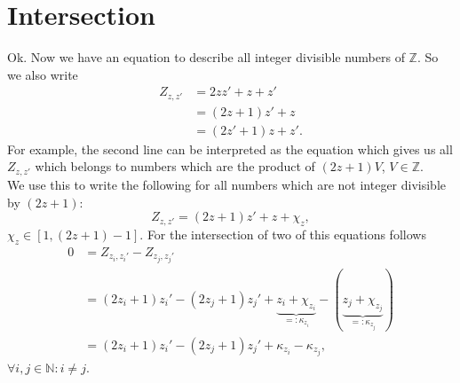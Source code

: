 \section{Intersection}
\label{s:intersection}
Ok. Now we have an equation to describe all integer divisible numbers of $\mathbb{Z}$. So we also write
\begin{equation}\begin{split}
	Z_{z,z\prime} & = 2zz\prime + z + z\prime \\
	& = \left(2z + 1\right)z\prime + z \\
	& = \left(2z\prime + 1\right)z + z\prime.	
\end{split}\label{eq:intdivnumbZ2}\end{equation}
For example, the second line can be interpreted as the equation which gives us all $Z_{z,z\prime}$ which belongs to numbers which are the product of $\left(2z + 1\right)V$, $V \in \mathbb{Z}$. \\
We use this to write the following for all numbers which are not integer divisible by $\left(2z + 1\right)$:
\begin{equation}
	Z_{z,z\prime} = \left(2z + 1\right)z\prime + z + \chi_{z},
\label{eq:notintdivZ}\end{equation}
$\chi_{z} \in [1, \left(2z + 1\right) - 1]$. For the intersection of two of this equations follows
\begin{equation}\begin{split}
	0 & = Z_{z_{i},z_{i}\prime} - Z_{z_{j},z_{j}\prime} \\
	& = \left(2z_{i} + 1\right)z_{i}\prime - \left(2z_{j} + 1\right)z_{j}\prime + \underbrace{z_{i} + \chi_{z_{i}}}_{=:\kappa_{z_{i}}} - \left(\underbrace{z_{j} + \chi_{z_{j}}}_{=:\kappa_{z_{j}}}\right) \\
	& = \left(2z_{i} + 1\right)z_{i}\prime - \left(2z_{j} + 1\right)z_{j}\prime + \kappa_{z_{i}} - \kappa_{z_{j}},
\end{split}\label{eq:intersection}\end{equation}
$\forall i,j \in \mathbb{N}: i \neq j$.
